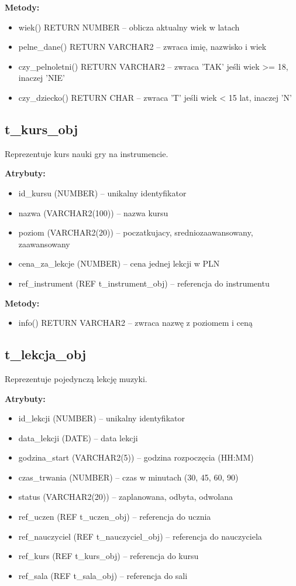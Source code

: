 \documentclass[12pt,a4paper]{article}
\begin{document}
\textbf{Metody:}
\begin{itemize}[nosep]
    \item wiek() RETURN NUMBER -- oblicza aktualny wiek w latach
    \item pelne\_dane() RETURN VARCHAR2 -- zwraca imię, nazwisko i wiek
    \item czy\_pelnoletni() RETURN VARCHAR2 -- zwraca 'TAK' jeśli wiek >= 18, inaczej 'NIE'
    \item czy\_dziecko() RETURN CHAR -- zwraca 'T' jeśli wiek < 15 lat, inaczej 'N'
\end{itemize}

\subsection{t\_kurs\_obj}

Reprezentuje kurs nauki gry na instrumencie.

\textbf{Atrybuty:}
\begin{itemize}[nosep]
    \item id\_kursu (NUMBER) -- unikalny identyfikator
    \item nazwa (VARCHAR2(100)) -- nazwa kursu
    \item poziom (VARCHAR2(20)) -- poczatkujacy, sredniozaawansowany, zaawansowany
    \item cena\_za\_lekcje (NUMBER) -- cena jednej lekcji w PLN
    \item ref\_instrument (REF t\_instrument\_obj) -- referencja do instrumentu
\end{itemize}

\textbf{Metody:}
\begin{itemize}[nosep]
    \item info() RETURN VARCHAR2 -- zwraca nazwę z poziomem i ceną
\end{itemize}

\subsection{t\_lekcja\_obj}

Reprezentuje pojedynczą lekcję muzyki.

\textbf{Atrybuty:}
\begin{itemize}[nosep]
    \item id\_lekcji (NUMBER) -- unikalny identyfikator
    \item data\_lekcji (DATE) -- data lekcji
    \item godzina\_start (VARCHAR2(5)) -- godzina rozpoczęcia (HH:MM)
    \item czas\_trwania (NUMBER) -- czas w minutach (30, 45, 60, 90)
    \item status (VARCHAR2(20)) -- zaplanowana, odbyta, odwolana
    \item ref\_uczen (REF t\_uczen\_obj) -- referencja do ucznia
    \item ref\_nauczyciel (REF t\_nauczyciel\_obj) -- referencja do nauczyciela
    \item ref\_kurs (REF t\_kurs\_obj) -- referencja do kursu
    \item ref\_sala (REF t\_sala\_obj) -- referencja do sali
\end{itemize}
\end{document}
